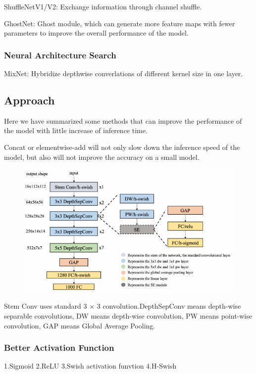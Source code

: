 \documentclass[11pt]{article}
\begin{document}
ShuffleNetV1/V2: Exchange information through channel shuffle.

GhostNet: Ghost module, which can generate more feature maps with fewer parameters to improve the overall performance of the model.

\subsubsection{Neural Architecture Search}

MixNet: Hybridize depthwise converlations of different kernel size in one layer.

\subsection{Approach}

Here we have summarized some methods that can improve the performance of the model with little increase of inference time.

Concat or elementwise-add will not only slow down the inference speed of the model, but also will not improve the accuracy on a small model.

\begin{figure}[h]
	\centering
	\includegraphics[scale = 0.5]{5}
\end{figure}
Stem Conv uses standard 3 $\times$ 3 convolution.DepthSepConv means depth-wise separable convolutions, DW means depth-wise convolution, PW means point-wise convolution, GAP means Global Average Pooling.
\subsubsection{Better Activation Function}

1.Sigmoid 2.ReLU 3.Swish activation funvtion 4.H-Swish
\end{document}
